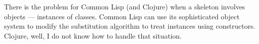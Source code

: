 \begin{remark}
There is the problem for Common Lisp (and Clojure) when a skeleton
involves objects --- instances of classes. Common Lisp can use its
sophisticated object system to modify the substitution algorithm to
treat instances using constructors. Clojure, well, I do not know how to
handle that situation.
\end{remark}

